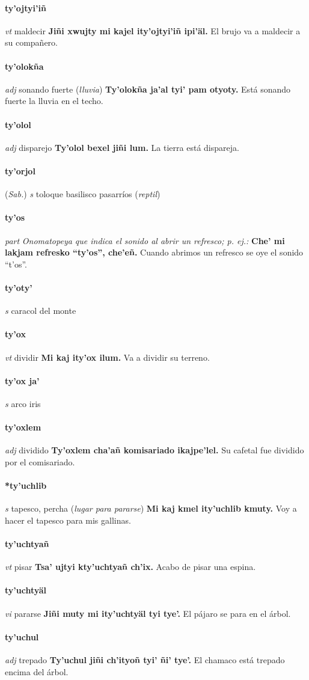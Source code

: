 \documentclass{scrbook}
\newcommand{\entry}[1]{\paragraph{#1}}
\newcommand{\nontranslationdef}[1]{\textit{#1}}
\newcommand{\partofspeech}[1]{\textit{#1}}
\newcommand{\spanishtranslation}[1]{#1}
\newcommand{\clarification}[1]{(\textit{#1})}
\newcommand{\cholexample}[1]{\textbf{#1}}
\newcommand{\exampletranslation}[1]{#1}
\newcommand{\relevantdialect}[1]{(\textit{#1})}
\begin{document}
\begin{multicols}{2}
\entry{ty'ojtyi'iñ}
\partofspeech{vt}
\spanishtranslation{maldecir}
\cholexample{Jiñi xwujty mi kajel ity'ojtyi'iñ ipi'äl.}
\exampletranslation{El brujo va a maldecir a su compañero.}

\entry{ty'olokña}
\partofspeech{adj}
\spanishtranslation{sonando fuerte}
\clarification{lluvia}
\cholexample{Ty'olokña ja'al tyi' pam otyoty.}
\exampletranslation{Está sonando fuerte la lluvia en el techo.}

\entry{ty'olol}
\partofspeech{adj}
\spanishtranslation{disparejo}
\cholexample{Ty'olol bexel jiñi lum.}
\exampletranslation{La tierra está dispareja.}

\entry{ty'orjol}
\relevantdialect{Sab.}
\partofspeech{s}
\spanishtranslation{toloque}
\spanishtranslation{basilisco}
\spanishtranslation{pasarríos}
\clarification{reptil}

\entry{ty'os}
\partofspeech{part}
\nontranslationdef{Onomatopeya que indica el sonido al abrir un refresco; p. ej.:}
\cholexample{Che' mi lakjam refresko “ty'os”, che'eñ.}
\exampletranslation{Cuando abrimos un refresco se oye el sonido “t'os”.}

\entry{ty'oty'}
\partofspeech{s}
\spanishtranslation{caracol del monte}

\entry{ty'ox}
\partofspeech{vt}
\spanishtranslation{dividir}
\cholexample{Mi kaj ity'ox ilum.}
\exampletranslation{Va a dividir su terreno.}

\entry{ty'ox ja'}
\partofspeech{s}
\spanishtranslation{arco iris}

\entry{ty'oxlem}
\partofspeech{adj}
\spanishtranslation{dividido}
\cholexample{Ty'oxlem cha'añ komisariado ikajpe'lel.}
\exampletranslation{Su cafetal fue dividido por el comisariado.}

\entry{*ty'uchlib}
\partofspeech{s}
\spanishtranslation{tapesco, percha}
\clarification{lugar para pararse}
\cholexample{Mi kaj kmel ity'uchlib kmuty.}
\exampletranslation{Voy a hacer el tapesco para mis gallinas.}

\entry{ty'uchtyañ}
\partofspeech{vt}
\spanishtranslation{pisar}
\cholexample{Tsa' ujtyi kty'uchtyañ ch'ix.}
\exampletranslation{Acabo de pisar una espina.}

\entry{ty'uchtyäl}
\partofspeech{vi}
\spanishtranslation{pararse}
\cholexample{Jiñi muty mi ity'uchtyäl tyi tye'.}
\exampletranslation{El pájaro se para en el árbol.}

\entry{ty'uchul}
\partofspeech{adj}
\spanishtranslation{trepado}
\cholexample{Ty'uchul jiñi ch'ityoñ tyi' ñi' tye'.}
\exampletranslation{El chamaco está trepado encima del árbol.}


\end{multicols}
\end{document}
